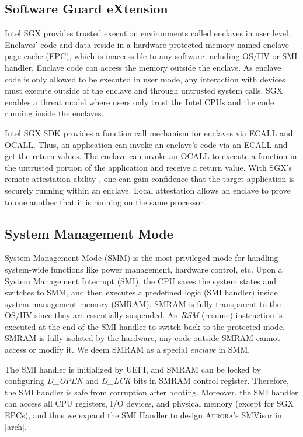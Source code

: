 \subsection{Software Guard eXtension}
Intel SGX \cite{DBLP:conf/isca/McKeenABRSSS13} provides trusted execution environments called enclaves in user level. Enclaves' code and data reside in a hardware-protected memory named enclave page cache (EPC), which is inaccessible to any software including OS/HV or SMI handler. Enclave code can access the memory outside the enclave. As enclave code is only allowed to be executed in user mode, any interaction with devices must execute outside of the enclave and through untrusted system calls. SGX enables a threat model where users only trust the Intel CPUs and the code running inside the enclaves.

Intel SGX SDK provides a function call mechanism for enclaves via ECALL and OCALL.  Thus, an application can invoke an enclave's code via an ECALL and get the return values. The enclave can invoke an OCALL to execute a function in the untrusted portion of the application and receive a return value. With SGX's remote attestation ability \cite{Anati2013InnovativeTF}, one can gain confidence that the target application is securely running within an enclave. Local attestation allows an enclave to prove to one another that it is running on the same processor.

\subsection{System Management Mode}
System Management Mode (SMM) is the most privileged mode for handling system-wide functions like power management, hardware control, etc. Upon a System Management Interrupt (SMI), the CPU saves the system states and switches to SMM, and then executes a predefined logic (SMI handler) inside system management memory (SMRAM). SMRAM is fully transparent to the OS/HV since they are essentially suspended. An \textit{RSM} (resume) instruction is executed at the end of the SMI handler to switch back to the protected mode.  SMRAM is fully isolated by the hardware, any code outside SMRAM cannot access or modify it. We deem SMRAM as a special \textit{enclave} in SMM.

The SMI handler is initialized by UEFI, and  SMRAM can be locked by configuring \emph{D\_OPEN} and \emph{D\_LCK} bits in SMRAM control register. Therefore, the SMI handler is safe from corruption after booting. Moreover, the SMI handler can access all CPU registers, I/O devices, and physical memory (except for SGX EPCs), and thus we expand the SMI Handler to design \textsc{Aurora}'s SMVisor in \autoref{arch}.

